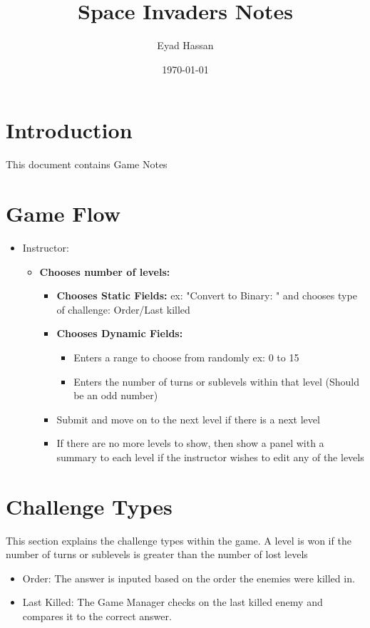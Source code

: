 \documentclass{article}
\title{Space Invaders Notes}
\author{Eyad Hassan}
\date{\today}
\begin{document}
\maketitle

\section{Introduction}
This document contains Game Notes


\newpage

\section{Game Flow}

\begin{itemize}
    \item Instructor:
    \begin{itemize}
        \item \textbf{Chooses number of levels:}
        \begin{itemize}
            \item \textbf{Chooses Static Fields:} ex: "Convert to Binary: " and chooses type of challenge: Order/Last killed
            \item \textbf{Chooses Dynamic Fields:} 
            \begin{itemize}
                \item Enters a range to choose from randomly ex: 0 to 15
                \item Enters the number of turns or sublevels within that level (Should be an odd number)
            \end{itemize}
            \item Submit and move on to the next level if there is a next level
            \item If there are no more levels to show, then show a panel with a summary to each level if the instructor wishes to edit any of the levels
        \end{itemize}
    \end{itemize}
\end{itemize}

\newpage

\section{Challenge Types}
This section explains the challenge types within the game.
A level is won if the number of turns or sublevels is greater than the number of lost levels
\begin{itemize}
    \item Order: The answer is inputed based on the order the enemies were killed in.
    \item Last Killed: The Game Manager checks on the last killed enemy and compares it to the correct answer.
\end{itemize}
\end{document}
